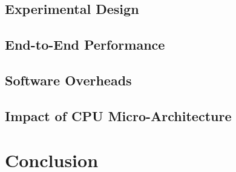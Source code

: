 \documentclass[12pt]{article}
\begin{document}
    \subsection{Experimental Design} \label{sec_expDesign}
        
    \subsection{End-to-End Performance} \label{sec_fullPerf}
        
    \subsection{Software Overheads} \label{sec_swOverhead}
        
    \subsection{Impact of CPU Micro-Architecture} \label{sec_uarchImpact}
        
        
\section{Conclusion} \label{sec_conclusion}
    

\listoftodos



\end{document}
